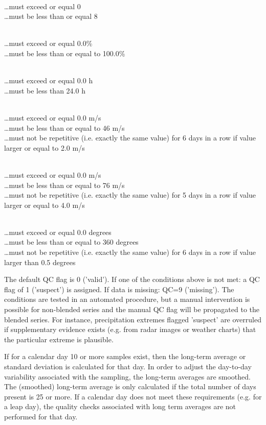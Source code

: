 \documentclass[a4paper,11pt]{article}
\begin{document}
\\
\ldots must exceed or equal 0\\
\ldots must be less than or equal 8
\medskip

\\
\ldots must exceed or equal 0.0\%\\
\ldots must be less than or equal to 100.0\%
\medskip

\\
\ldots must exceed or equal 0.0 h\\
\ldots must be less than 24.0 h
\medskip

\\
\ldots must exceed or equal 0.0 m/s\\
\ldots must be less than or equal to 46 m/s\\
\ldots must not be repetitive (i.e. exactly the same value) for 6
days in a row if value larger or equal to 2.0 m/s
\medskip

\\
\ldots must exceed or equal 0.0 m/s\\
\ldots must be less than or equal to 76 m/s\\
\ldots must not be repetitive (i.e. exactly the same value) for 5
days in a row if value larger or equal to 4.0 m/s
\medskip

\\
\ldots must exceed or equal 0.0 degrees\\
\ldots must be less than or equal to 360 degrees\\
\ldots must not be repetitive (i.e. exactly the same value) for 6 days
in a row if value larger than 0.5 degrees
\medskip

The default QC flag is 0 ('valid'). If one of the conditions above is
not met: a QC flag of 1 ('suspect') is assigned. If data is missing:
QC=9 ('missing'). The conditions are tested in an automated procedure,
but a manual intervention is possible for non-blended series and the
manual QC flag will be propagated to the blended series. For instance,
precipitation extremes flagged 'suspect' are overruled if
supplementary evidence exists (e.g. from radar images or weather
charts) that the particular extreme is plausible.

If for a calendar day 10 or more samples exist, then the long-term
average or standard deviation is calculated for that day. In order to
adjust the day-to-day variability associated with the sampling, the
long-term averages are smoothed. The (smoothed) long-term average is
only calculated if the total number of days present is 25 or more. If
a calendar day does not meet these requirements (e.g. for a leap day),
the quality checks associated with long term averages are not
performed for that day.
\end{document}
